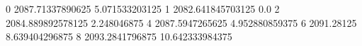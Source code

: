 0 2087.71337890625 5.071533203125
1 2082.641845703125 0.0
2 2084.889892578125 2.248046875
4 2087.5947265625 4.952880859375
6 2091.28125 8.639404296875
8 2093.2841796875 10.642333984375
